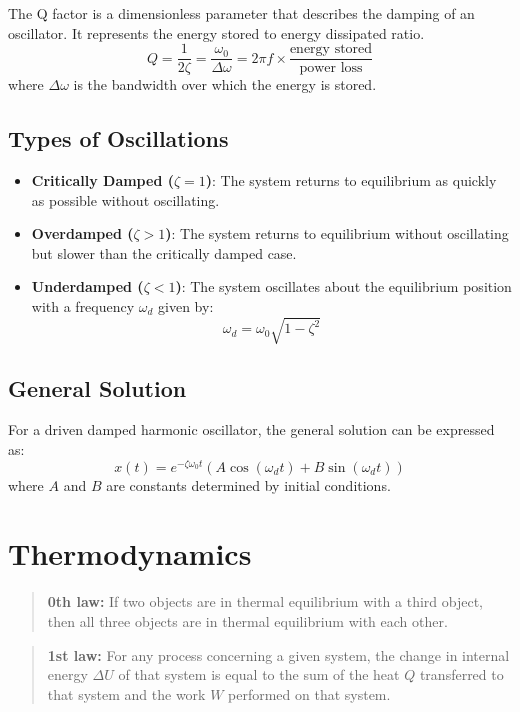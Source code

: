 \documentclass[12pt,a4paper]{article}
\begin{document}
	The Q factor is a dimensionless parameter that describes the damping of an oscillator. It represents the energy stored to energy dissipated ratio. 
	\[
	Q = \frac{1}{2\zeta} = \frac{\omega_0}{\Delta \omega} = 2 \pi f \times \frac{\text{energy stored}}{\text{power loss}}
	\]
	where \( \Delta \omega \) is the bandwidth over which the energy is stored.
	
	\subsection*{Types of Oscillations}
	
	\begin{itemize}
		\item \textbf{Critically Damped (\( \zeta = 1 \))}: The system returns to equilibrium as quickly as possible without oscillating.
		\item \textbf{Overdamped (\( \zeta > 1 \))}: The system returns to equilibrium without oscillating but slower than the critically damped case.
		\item \textbf{Underdamped (\( \zeta < 1 \))}: The system oscillates about the equilibrium position with a frequency \( \omega_d \) given by:
		\[
		\omega_d = \omega_0 \sqrt{1 - \zeta^2}
		\]
	\end{itemize}
	
	\subsection*{General Solution}
	
	For a driven damped harmonic oscillator, the general solution can be expressed as:
	\[
	x(t) = e^{-\zeta \omega_0 t} \left( A \cos(\omega_d t) + B \sin(\omega_d t) \right)
	\]
	where \( A \) and \( B \) are constants determined by initial conditions.
	
\section*{Thermodynamics}

\begin{quote}
\textbf{0th law:} 
If two objects are in thermal equilibrium with a third object, then all three objects are in thermal equilibrium with each other.
\end{quote}
\begin{quote}
\textbf{1st law:} 
For any process concerning a given system, the change in internal energy \(\Delta U\) of that system is equal to the sum of the heat \( Q \) transferred to that system and the work \( W \) performed on that system.
\end{quote}
\end{document}
